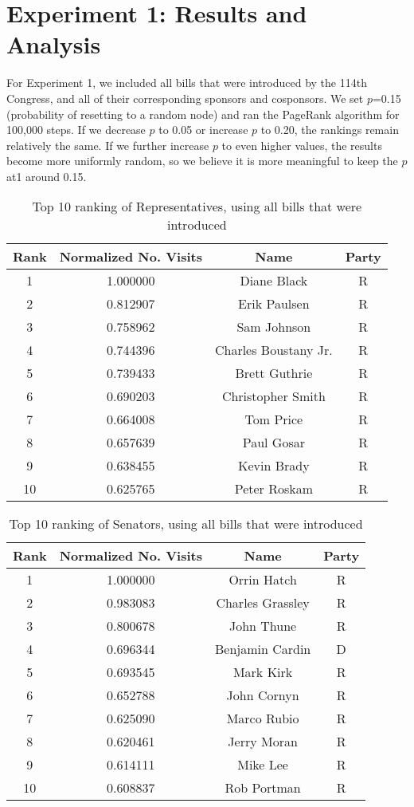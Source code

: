 \documentclass[11pt]{article}
\begin{document}
\section*{Experiment 1: Results and Analysis}
For Experiment 1, we included all bills that were introduced by the 114th Congress, and all of their corresponding sponsors and cosponsors. We set $p$=0.15 (probability of resetting to a random node) and ran the PageRank algorithm for 100,000 steps. If we decrease $p$ to 0.05 or increase $p$ to 0.20, the rankings remain relatively the same. If we further increase $p$ to even higher values, the results become more uniformly random, so we believe it is more meaningful to keep the $p$ at1 around 0.15. 


\begin{table}[h!]
\centering
 \begin{tabular}{|c | c |c |c|} 
 \hline
 Rank & Normalized No. Visits & Name & Party \\ [0.5ex] 
 \hline
1  & 1.000000 & Diane Black & R \\
2  & 0.812907 & Erik Paulsen & R \\
3  & 0.758962 & Sam Johnson & R \\
4  & 0.744396 & Charles Boustany Jr. & R \\
5  & 0.739433 & Brett Guthrie & R \\
6  & 0.690203 & Christopher Smith & R \\
7  & 0.664008 & Tom Price & R \\
8  & 0.657639 & Paul Gosar & R \\
9  & 0.638455 & Kevin Brady & R \\
10 &  0.625765 &  Peter Roskam & R \\
 \hline
 
\end{tabular}
\caption{Top 10 ranking of Representatives, using all bills that were introduced}
\label{table:experiment1}
\end{table}

\begin{table}[h!]
\centering
 \begin{tabular}{|c | c |c |c|} 
 \hline
 Rank & Normalized No. Visits & Name & Party \\ [0.5ex] 
 \hline
1  & 1.000000 & Orrin Hatch &R\\
2  & 0.983083 & Charles Grassley &R\\
3  & 0.800678 & John Thune &R\\
4  & 0.696344  & Benjamin Cardin & D\\
5  & 0.693545  & Mark Kirk & R\\
6  & 0.652788  & John Cornyn & R\\
7  & 0.625090  & Marco Rubio & R\\
8  & 0.620461  & Jerry Moran & R\\
9  & 0.614111  & Mike Lee & R\\
10 &  0.608837 &  Rob Portman & R\\
 \hline
 
\end{tabular}
\caption{Top 10 ranking of Senators, using all bills that were introduced}
\label{table:experiment1_2}
\end{table}
\end{document}

